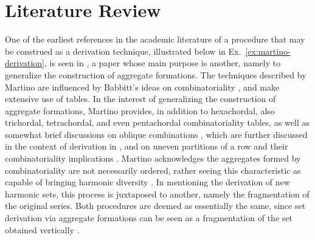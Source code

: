 
\section{Literature Review}

One of the earliest references in the academic literature of a procedure that may be construed as a derivation technique, illustrated below in Ex.~\ref{ex:martino-derivation}, is seen in \cite{Martino1961}, a paper whose main purpose is another, namely to generalize the construction of aggregate formations. The techniques described by Martino are influenced by Babbitt's ideas on combinatoriality \cite[224]{Martino1961}, and make extensive use of tables. In the interest of generalizing the construction of aggregate formations, Martino provides, in addition to hexachordal, also trichordal, tetrachordal, and even pentachordal combinatoriality tables, as well as somewhat brief discussions on oblique combinations \cite[241]{Martino1961}, which are further discussed in the context of derivation in \cite[216]{Starr1984}, and on uneven partitions of a row and their combinatoriality implications \cite[267]{Martino1961}. Martino acknowledges the aggregates formed by combinatoriality are not necessarily ordered, rather seeing this characteristic as capable of bringing harmonic diversity \cite[228, 230]{Martino1961}. In mentioning the derivation of new harmonic sets, this process is juxtaposed to another, namely the fragmentation of the original series. Both procedures are deemed as essentially the same, since set derivation via aggregate formations can be seen as a fragmentation of the set obtained vertically \cite[230, 231]{Martino1961}.

